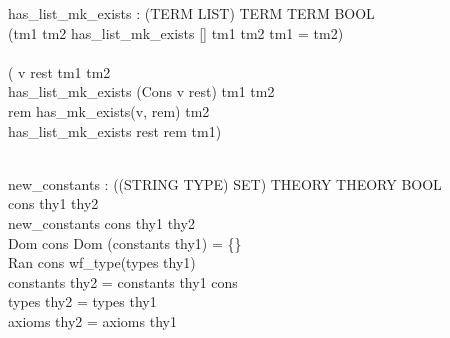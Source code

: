 \documentclass[a4paper,11pt,titlepage]{article}
\begin{document}
\begin{titlepage}
\begin{HOLConst}
\+	\PrNL{}has\_list\_mk\_exists\PrNN{} : (TERM LIST) \MMM{\rightarrow} TERM \MMM{\rightarrow} TERM \MMM{\rightarrow} BOOL\\
\PrPH{}
\+	(\MMM{\forall}tm1 tm2\MMM{\bullet} has\_list\_mk\_exists [] tm1 tm2 \MMM{\Leftrightarrow} tm1 = tm2)\\
\+	\MMM{\land}\\
\+	(\MMM{\forall} v rest tm1 tm2 \MMM{\bullet}\\
\+	has\_list\_mk\_exists (Cons v rest) tm1 tm2 \MMM{\Leftrightarrow}\\
\+	\MMM{\exists} rem \MMM{\bullet} has\_mk\_exists(v, rem) tm2 \MMM{\land}\\
\+		has\_list\_mk\_exists rest rem tm1)\\
\+	\\
\end{HOLConst}

\begin{HOLConst}
\+	\PrNL{}new\_constants\PrNN{} : ((STRING \MMM{\times} TYPE) SET) \MMM{\rightarrow} THEORY \MMM{\rightarrow} THEORY \MMM{\rightarrow} BOOL\\
\PrPH{}
\+	\MMM{\forall} cons thy1 thy2 \MMM{\bullet}\\
\+	new\_constants cons thy1 thy2 \MMM{\Leftrightarrow}\\
\+	Dom cons \MMM{\cap} Dom (constants thy1) = \{\} \MMM{\land}\\
\+	Ran cons \MMM{\subseteq} wf\_type(types thy1) \MMM{\land}\\
\+	constants thy2 = constants thy1 \MMM{\cup} cons \MMM{\land}\\
\+	types thy2 = types thy1 \MMM{\land}\\
\+	axioms thy2 = axioms thy1\\
\end{HOLConst}


\end{titlepage}
\end{document}
